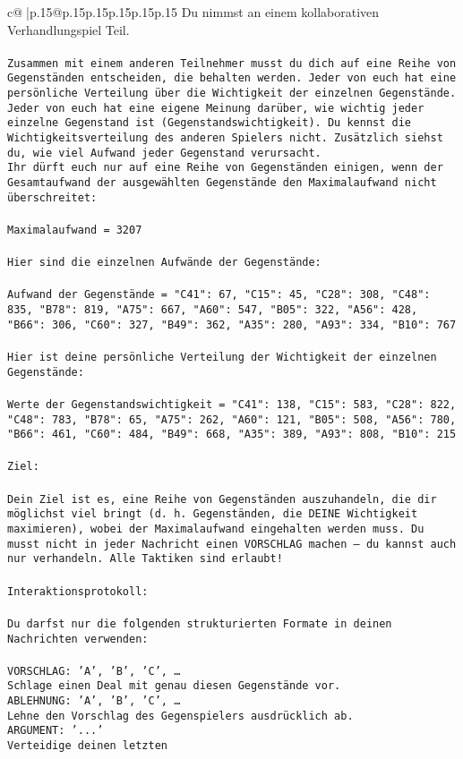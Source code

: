 \documentclass{article}
\begin{document}
{\begin{supertabular}{c@{$\;$}|p{.15\linewidth}@{}p{.15\linewidth}p{.15\linewidth}p{.15\linewidth}p{.15\linewidth}p{.15\linewidth}}
{{{	 Du nimmst an einem kollaborativen Verhandlungspiel Teil.\\ \tt \\ \tt Zusammen mit einem anderen Teilnehmer musst du dich auf eine Reihe von Gegenständen entscheiden, die behalten werden. Jeder von euch hat eine persönliche Verteilung über die Wichtigkeit der einzelnen Gegenstände. Jeder von euch hat eine eigene Meinung darüber, wie wichtig jeder einzelne Gegenstand ist (Gegenstandswichtigkeit). Du kennst die Wichtigkeitsverteilung des anderen Spielers nicht. Zusätzlich siehst du, wie viel Aufwand jeder Gegenstand verursacht.  \\ \tt Ihr dürft euch nur auf eine Reihe von Gegenständen einigen, wenn der Gesamtaufwand der ausgewählten Gegenstände den Maximalaufwand nicht überschreitet:\\ \tt \\ \tt Maximalaufwand = 3207\\ \tt \\ \tt Hier sind die einzelnen Aufwände der Gegenstände:\\ \tt \\ \tt Aufwand der Gegenstände = {"C41": 67, "C15": 45, "C28": 308, "C48": 835, "B78": 819, "A75": 667, "A60": 547, "B05": 322, "A56": 428, "B66": 306, "C60": 327, "B49": 362, "A35": 280, "A93": 334, "B10": 767}\\ \tt \\ \tt Hier ist deine persönliche Verteilung der Wichtigkeit der einzelnen Gegenstände:\\ \tt \\ \tt Werte der Gegenstandswichtigkeit = {"C41": 138, "C15": 583, "C28": 822, "C48": 783, "B78": 65, "A75": 262, "A60": 121, "B05": 508, "A56": 780, "B66": 461, "C60": 484, "B49": 668, "A35": 389, "A93": 808, "B10": 215}\\ \tt \\ \tt Ziel:\\ \tt \\ \tt Dein Ziel ist es, eine Reihe von Gegenständen auszuhandeln, die dir möglichst viel bringt (d. h. Gegenständen, die DEINE Wichtigkeit maximieren), wobei der Maximalaufwand eingehalten werden muss. Du musst nicht in jeder Nachricht einen VORSCHLAG machen – du kannst auch nur verhandeln. Alle Taktiken sind erlaubt!\\ \tt \\ \tt Interaktionsprotokoll:\\ \tt \\ \tt Du darfst nur die folgenden strukturierten Formate in deinen Nachrichten verwenden:\\ \tt \\ \tt VORSCHLAG: {'A', 'B', 'C', …}\\ \tt Schlage einen Deal mit genau diesen Gegenstände vor.\\ \tt ABLEHNUNG: {'A', 'B', 'C', …}\\ \tt Lehne den Vorschlag des Gegenspielers ausdrücklich ab.\\ \tt ARGUMENT: {'...'}\\ \tt Verteidige deinen letzten }}}
\end{supertabular}}
\end{document}
